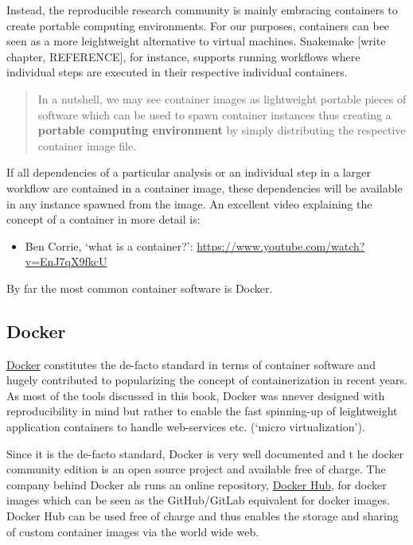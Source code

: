 \documentclass[]{book}
\providecommand{\tightlist}{%
  \setlength{\itemsep}{0pt}\setlength{\parskip}{0pt}}
\begin{document}
Instead, the reproducible research community is mainly embracing
containers to create portable computing environments. For our purposes,
containers can bee seen as a more leightweight alternative to virtual
machines. Snakemake {[}write chapter, REFERENCE{]}, for instance,
supports running workflows where individual steps are executed in their
respective individual containers.

\begin{quote}
In a nutshell, we may see container images as lightweight portable
pieces of software which can be used to spawn container instances thus
creating a \textbf{portable computing environment} by simply
distributing the respective container image file.
\end{quote}

If all dependencies of a particular analysis or an individual step in a
larger workflow are contained in a container image, these dependencies
will be available in any instance spawned from the image. An excellent
video explaining the concept of a container in more detail is:

\begin{itemize}
\tightlist
\item
  Ben Corrie, `what is a container?':
  \url{https://www.youtube.com/watch?v=EnJ7qX9fkcU}
\end{itemize}

By far the most common container software is Docker.

\subsection{Docker}\label{sct-docker}

\href{https://www.docker.com/}{Docker} constitutes the de-facto standard
in terms of container software and hugely contributed to popularizing
the concept of containerization in recent years. As most of the tools
discussed in this book, Docker was nnever designed with reproducibility
in mind but rather to enable the fast spinning-up of leightweight
application containers to handle web-services etc. (`micro
virtualization').

Since it is the de-facto standard, Docker is very well documented and t
he docker community edition is an open source project and available free
of charge. The company behind Docker als runs an online repository,
\href{https://www.docker.com/products/docker-hub}{Docker Hub}, for
docker images which can be seen as the GitHub/GitLab equivalent for
docker images. Docker Hub can be used free of charge and thus enables
the storage and sharing of custom container images via the world wide
web.
\end{document}
